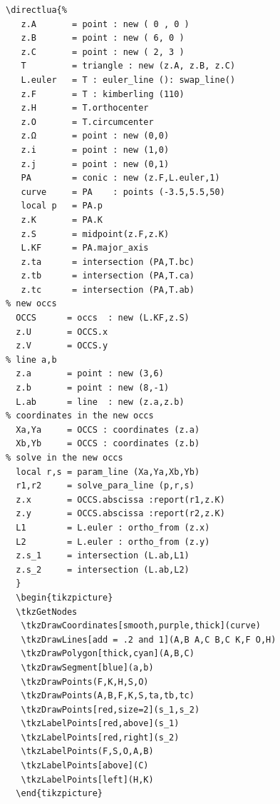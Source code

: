 \begin{Verbatim}
\directlua{%
   z.A       = point : new ( 0 , 0 )
   z.B       = point : new ( 6, 0 )
   z.C       = point : new ( 2, 3 )
   T         = triangle : new (z.A, z.B, z.C)
   L.euler   = T : euler_line (): swap_line()
   z.F       = T : kimberling (110) 
   z.H       = T.orthocenter
   z.O       = T.circumcenter
   z.Ω       = point : new (0,0)
   z.i       = point : new (1,0)
   z.j       = point : new (0,1)      
   PA        = conic : new (z.F,L.euler,1)
   curve     = PA    : points (-3.5,5.5,50)
   local p   = PA.p
   z.K       = PA.K
   z.S       = midpoint(z.F,z.K)
   L.KF      = PA.major_axis
   z.ta      = intersection (PA,T.bc)
   z.tb      = intersection (PA,T.ca)
   z.tc      = intersection (PA,T.ab)
% new occs
  OCCS      = occs  : new (L.KF,z.S)
  z.U       = OCCS.x
  z.V       = OCCS.y
% line a,b
  z.a       = point : new (3,6)
  z.b       = point : new (8,-1)
  L.ab      = line  : new (z.a,z.b)
% coordinates in the new occs
  Xa,Ya     = OCCS : coordinates (z.a)
  Xb,Yb     = OCCS : coordinates (z.b)
% solve in the new occs
  local r,s = param_line (Xa,Ya,Xb,Yb)
  r1,r2     = solve_para_line (p,r,s)
  z.x       = OCCS.abscissa :report(r1,z.K)
  z.y       = OCCS.abscissa :report(r2,z.K)
  L1        = L.euler : ortho_from (z.x)
  L2        = L.euler : ortho_from (z.y)
  z.s_1     = intersection (L.ab,L1)
  z.s_2     = intersection (L.ab,L2)
  } 
  \begin{tikzpicture}
  \tkzGetNodes 
   \tkzDrawCoordinates[smooth,purple,thick](curve)
   \tkzDrawLines[add = .2 and 1](A,B A,C B,C K,F O,H)
   \tkzDrawPolygon[thick,cyan](A,B,C)
   \tkzDrawSegment[blue](a,b)
   \tkzDrawPoints(F,K,H,S,O)
   \tkzDrawPoints(A,B,F,K,S,ta,tb,tc)
   \tkzDrawPoints[red,size=2](s_1,s_2)
   \tkzLabelPoints[red,above](s_1)
   \tkzLabelPoints[red,right](s_2)
   \tkzLabelPoints(F,S,O,A,B)
   \tkzLabelPoints[above](C)
   \tkzLabelPoints[left](H,K)
  \end{tikzpicture}
\end{Verbatim}

